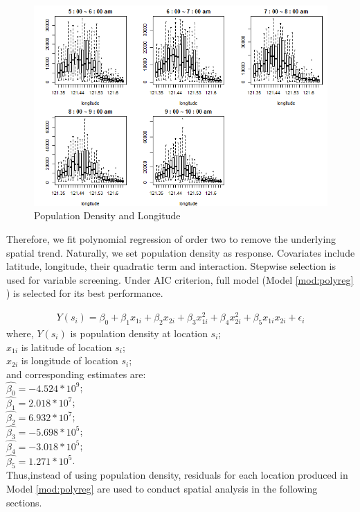 \documentclass[hidelinks,12pt]{article}
\begin{document}
\begin{figure}[!ht]
		\includegraphics[width=\textwidth]{long.png}
		\caption{Population Density and Longitude\label{fig:long}}
\end{figure}
\FloatBarrier

Therefore, we fit polynomial regression of order two to remove the underlying spatial trend. Naturally, we set population density as response. Covariates include latitude, longitude, their quadratic term and interaction. Stepwise selection is used for variable screening. Under AIC criterion, full model (Model \ref{mod:polyreg} ) is selected for its best performance.

\begin{align}
\label{mod:polyreg}
Y(s_i)=\beta_0 +\beta_1x_{1i} +\beta_2x_{2i} +\beta_3x_{1i}^2 +\beta_4x_{2i}^2+\beta_5x_{1i}x_{2i}+\epsilon_i
\end{align}
where,
$Y(s_i)$ is population density at location $s_i$;\\
$x_{1i}$ is latitude of location $s_i$;\\
$x_{2i}$ is longitude of location $s_i$;\\
and corresponding estimates are:\\
$\hat{\beta_0}=-4.524*10^9$;\\
$\hat{\beta_1}=2.018*10^7$;\\
$\hat{\beta_2}=6.932*10^7$;\\
$\hat{\beta_3}=-5.698*10^5$;\\
$\hat{\beta_4}=-3.018*10^5$;\\
$\hat{\beta_5}=1.271*10^5$.\\

Thus,instead of using population density, residuals for each location produced in Model \ref{mod:polyreg} are used to conduct spatial analysis in the following sections.
\end{document}
